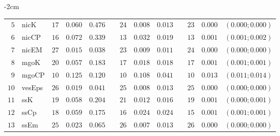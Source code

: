 \begin{table*}[!htbp]
\begin{adjustwidth*}{}{-2cm}
\begin{tabular}{@{}rlrrrrrrrrrcc@{}}
\footnotesize{$5 $} & \footnotesize{nicK     } & \footnotesize{$17$} & \footnotesize{$0.060$} & \footnotesize{$0.476$} && \footnotesize{$24$} & \footnotesize{$0.008$} & \footnotesize{$0.013$} && \footnotesize{$23$} & \footnotesize{$0.000$} & \footnotesize{$(0.000;0.000)$} \\
\footnotesize{$6 $} & \footnotesize{nicCP    } & \footnotesize{$16$} & \footnotesize{$0.072$} & \footnotesize{$0.339$} && \footnotesize{$13$} & \footnotesize{$0.032$} & \footnotesize{$0.019$} && \footnotesize{$13$} & \footnotesize{$0.001$} & \footnotesize{$(0.001;0.002)$} \\
\footnotesize{$7 $} & \footnotesize{nicEM    } & \footnotesize{$27$} & \footnotesize{$0.015$} & \footnotesize{$0.038$} && \footnotesize{$23$} & \footnotesize{$0.009$} & \footnotesize{$0.011$} && \footnotesize{$24$} & \footnotesize{$0.000$} & \footnotesize{$(0.000;0.000)$} \\
\footnotesize{$8 $} & \footnotesize{mgoK     } & \footnotesize{$20$} & \footnotesize{$0.057$} & \footnotesize{$0.183$} && \footnotesize{$17$} & \footnotesize{$0.018$} & \footnotesize{$0.018$} && \footnotesize{$17$} & \footnotesize{$0.001$} & \footnotesize{$(0.001;0.001)$} \\
\footnotesize{$9 $} & \footnotesize{mgoCP    } & \footnotesize{$10$} & \footnotesize{$0.125$} & \footnotesize{$0.120$} && \footnotesize{$10$} & \footnotesize{$0.108$} & \footnotesize{$0.041$} && \footnotesize{$10$} & \footnotesize{$0.013$} & \footnotesize{$(0.011;0.014)$} \\
\footnotesize{$10$} & \footnotesize{vesEps   } & \footnotesize{$26$} & \footnotesize{$0.019$} & \footnotesize{$0.041$} && \footnotesize{$25$} & \footnotesize{$0.008$} & \footnotesize{$0.013$} && \footnotesize{$25$} & \footnotesize{$0.000$} & \footnotesize{$(0.000;0.000)$} \\
\footnotesize{$11$} & \footnotesize{ssK      } & \footnotesize{$19$} & \footnotesize{$0.058$} & \footnotesize{$0.204$} && \footnotesize{$21$} & \footnotesize{$0.012$} & \footnotesize{$0.016$} && \footnotesize{$19$} & \footnotesize{$0.001$} & \footnotesize{$(0.000;0.001)$} \\
\footnotesize{$12$} & \footnotesize{ssCp     } & \footnotesize{$18$} & \footnotesize{$0.059$} & \footnotesize{$0.175$} && \footnotesize{$16$} & \footnotesize{$0.024$} & \footnotesize{$0.024$} && \footnotesize{$15$} & \footnotesize{$0.001$} & \footnotesize{$(0.001;0.001)$} \\
\footnotesize{$13$} & \footnotesize{ssEm     } & \footnotesize{$25$} & \footnotesize{$0.023$} & \footnotesize{$0.065$} && \footnotesize{$26$} & \footnotesize{$0.007$} & \footnotesize{$0.013$} && \footnotesize{$26$} & \footnotesize{$0.000$} & \footnotesize{$(0.000;0.000)$} \\

\end{tabular}
\end{adjustwidth*}
\end{table*}
